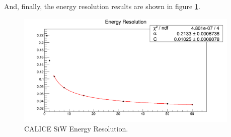 And, finally, the energy resolution results are shown in figure \ref{fig:simulations_hgc_pbresolution}.
 \begin{figure}[htbp]
    \centering
    \includegraphics[width=0.95\textwidth]{figures/ch_simulations/hgc/performance/Pb/Resolution.png}
    \caption{{\sc CALICE} SiW Energy Resolution.}
    \label{fig:simulations_hgc_pbresolution}
 \end{figure}